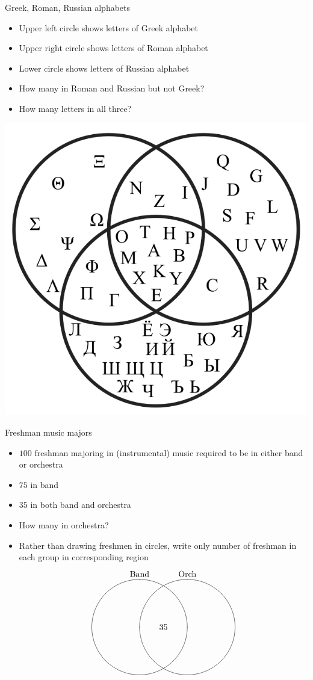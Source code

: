 \documentclass[handout]{beamer}
\theoremstyle{definition}
\begin{document}
\begin{frame}{Greek, Roman, Russian alphabets}
\begin{multicols}{2}
\begin{itemize}
\item Upper left circle shows letters of Greek alphabet
\item Upper right circle shows letters of Roman alphabet
\item Lower circle shows letters of Russian alphabet
\item How many in Roman and Russian but not Greek?
\item How many letters in all three?
\end{itemize}
\includegraphics[scale=.25]{Venn}
\end{multicols}
\end{frame}

\begin{frame}{Freshman music majors}
\begin{itemize}
\item $100$ freshman majoring in (instrumental) music
required to be in either band or orchestra
\item $75$ in band
\item $35$ in both band and orchestra
\item How many in orchestra?
\item Rather than drawing freshmen in circles,
write only \alert{number} of freshman in each
group in corresponding region 
\[\begin{xy}<1cm,0cm>:
(-1,2)*+!D{\text{Band}};
(1,2)*+!D{\text{Orch}};
(-1,0)*\cir<2cm>{};
(1,0)*\cir<2cm>{};
(0,0)*{35};
\end{xy}\]
\end{itemize}
\end{frame}
\end{document}
